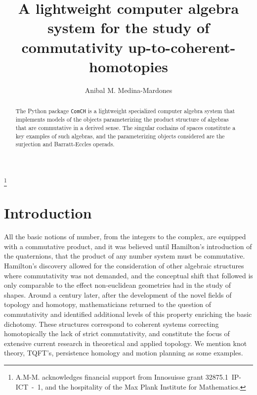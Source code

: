 \documentclass{amsart}
\begin{document}
\title{A lightweight computer algebra system for the study of commutativity up-to-coherent-homotopies}
\author{Anibal M. Medina-Mardones}
\address{Max Plank Institute for Mathematics, Bonn, Germany}
\address{Department of Mathematics, University of Notre Dame, Notre Dame, IN, USA}
\thanks{A.M-M. acknowledges financial support from Innosuisse grant \mbox{32875.1 IP-ICT - 1}, and the hospitality of the Max Plank Institute for Mathematics.}

\begin{abstract}
	The Python package \texttt{ComCH} is a lightweight specialized computer algebra system that implements models of the objects parameterizing the product structure of algebras that are commutative in a derived sense. The singular cochains of spaces constitute a key examples of such algebras, and the parameterizing objects considered are the surjection and Barratt-Eccles operads.
\end{abstract} 

\maketitle

\section{Introduction}

All the basic notions of number, from the integers to the complex, are equipped with a commutative product, and it was believed until Hamilton's introduction of the quaternions, that the product of any number system must be commutative. Hamilton's discovery allowed for the consideration of other algebraic structures where commutativity was not demanded, and the conceptual shift that followed is only comparable to the effect non-euclidean geometries had in the study of shapes. Around a century later, after the development of the novel fields of topology and homotopy, mathematicians returned to the question of commutativity and identified additional levels of this property enriching the basic dichotomy. These structures correspond to coherent systems correcting homotopically the lack of strict commutativity, and constitute the focus of extensive current research in theoretical and applied topology. We mention knot theory, TQFT's, persistence homology and motion planning as some examples.
\end{document}
